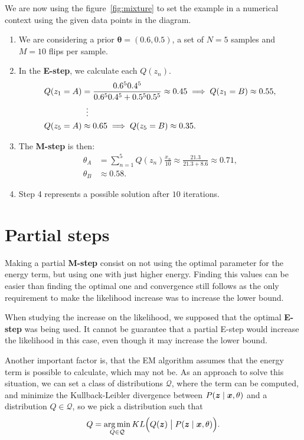We are now using the figure~\ref{fig:mixture} to set the example in a numerical context using the given data points in the diagram.
\begin{enumerate}
  \item We are considering a prior \(\bm{\theta} = (0.6, 0.5)\), a set of \(N = 5\) samples and \(M = 10\) flips per sample.
  \item In the \textbf{E-step}, we calculate each \(Q(z_{n})\).
    \[
    \begin{aligned}
      Q(z_{1} = A) &= \frac{0.6^{5} 0.4^{5}}{0.6^{5}0.4^{5} + 0.5^{5}0.5^{5}} \approx 0.45 \implies Q(z_{1} = B) \approx 0.55,\\
      &\mathrel{\makebox[\widthof{=}]{\vdots}} \\
      Q(z_{5} = A) &\approx 0.65 \implies Q(z_{5}=B) \approx 0.35.
    \end{aligned}
    \]
  \item The \textbf{M-step} is then:
    \[
    \begin{aligned}
      \theta_{A} &= \sum_{n=1}^{5}Q(z_{n})\frac{x_{n}}{10} \approx \frac{21.3}{21.3 + 8.6} \approx 0.71,\\
      \theta_{B} &\approx 0.58.
    \end{aligned}
    \]
  \item Step 4 represents a possible solution after \(10\) iterations.
\end{enumerate}


\section{Partial steps}

Making a partial \textbf{M-step} consist on not using the optimal parameter for the energy term, but using one with just higher energy. Finding this values can be easier than finding the optimal one and convergence still follows as the only requirement to make the likelihood increase was to increase the lower bound.

When studying the increase on the likelihood, we supposed that the optimal \textbf{E-step} was being used. It cannot be guarantee that a partial E-step would increase the likelihood in this case, even though it may increase the lower bound.

Another important factor is, that the EM algorithm assumes that the energy term is possible to calculate, which may not be. As an approach to solve this situation, we can set a class of distributions \(\mathcal{Q}\), where the term can be computed, and minimize the Kullback-Leibler divergence between \(P(\bm{z} \mid \bm{x}, \theta)\) and a distribution \(Q \in \mathcal{Q}\), so we pick a distribution such that
\[
  Q = \operatorname*{arg\,min}_{Q \in \mathcal{Q}} KL\Big(Q(\bm{z}) \bigm| P(\bm{z}\mid \bm{x}, \theta)\Big).
\]


